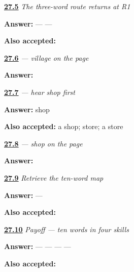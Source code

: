 \noindent\begin{minipage}[t]{\linewidth}
\raggedright
\hyperlink{review-GU-R23-route-three-r1-writing}{\textbf{27.5}} \emph{The three-word route returns at R1}\par
\small \textbf{Answer:}  —  — \par
\footnotesize \textbf{Also accepted:}   
\end{minipage}\par\medskip

\noindent\begin{minipage}[t]{\linewidth}
\raggedright
\hyperlink{review-GU-C23-gaam-delayed}{\textbf{27.6}} \emph{ — village on the page}\par
\small \textbf{Answer:} \par
\end{minipage}\par\medskip

\noindent\begin{minipage}[t]{\linewidth}
\raggedright
\hyperlink{review-GU-C23-hear-dukaan-recall}{\textbf{27.7}} \emph{ — hear shop first}\par
\small \textbf{Answer:} shop\par
\footnotesize \textbf{Also accepted:} a shop; store; a store
\end{minipage}\par\medskip

\noindent\begin{minipage}[t]{\linewidth}
\raggedright
\hyperlink{review-GU-C23-dukaan-copy}{\textbf{27.8}} \emph{ — shop on the page}\par
\small \textbf{Answer:} \par
\end{minipage}\par\medskip

\noindent\begin{minipage}[t]{\linewidth}
\raggedright
\hyperlink{review-GU-R23-map-ten-recall}{\textbf{27.9}} \emph{Retrieve the ten-word map}\par
\small \textbf{Answer:}  — \par
\footnotesize \textbf{Also accepted:}  
\end{minipage}\par\medskip

\noindent\begin{minipage}[t]{\linewidth}
\raggedright
\hyperlink{review-GU-C23-map-ten-payoff}{\textbf{27.10}} \emph{Payoff — ten words in four skills}\par
\small \textbf{Answer:}  —  —  —  — \par
\footnotesize \textbf{Also accepted:}     
\end{minipage}\par\medskip

